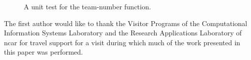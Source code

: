 \begin{figure}
  
  \caption{A unit test for the team-number function.\label{fig:team-number-test}}
\end{figure}

\begin{acks}
The first author would like to thank the Visitor Programs of the Computational Information Systems Laboratory and the Research Applications Laboratory of \gls{ncar} for travel support for a visit during which much of the work presented in this paper was performed.


\end{acks}
